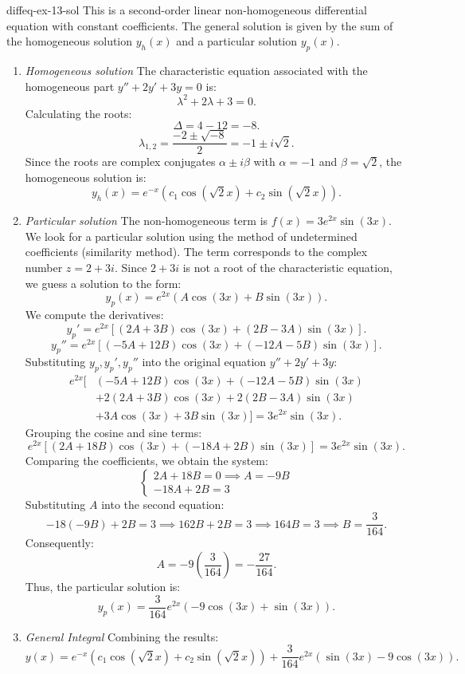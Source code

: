 \documentclass[preview]{standalone}
\begin{document}
\begin{snippetsolution}{diffeq-ex-13-sol}{}
    This is a second-order linear non-homogeneous differential equation with constant coefficients. The general solution is given by the sum of the homogeneous solution \(y_h(x)\) and a particular solution \(y_p(x)\).
    \begin{enumerate}
        \item \emph{Homogeneous solution}
        The characteristic equation associated with the homogeneous part \(y'' + 2y' + 3y = 0\) is:
        \[ \lambda^2 + 2\lambda + 3 = 0. \]
        Calculating the roots:
        \[ \Delta = 4 - 12 = -8. \]
        \[ \lambda_{1,2} = \frac{-2 \pm \sqrt{-8}}{2} = -1 \pm i\sqrt{2}. \]
        Since the roots are complex conjugates \(\alpha \pm i\beta\) with \(\alpha = -1\) and \(\beta = \sqrt{2}\), the homogeneous solution is:
        \[ y_h(x) = e^{-x}(c_1 \cos(\sqrt{2}x) + c_2 \sin(\sqrt{2}x)). \]
        \item \emph{Particular solution}
        The non-homogeneous term is \(f(x) = 3e^{2x} \sin(3x)\).
        We look for a particular solution using the method of undetermined coefficients (similarity method). The term corresponds to the complex number \(z = 2 + 3i\). Since \(2 + 3i\) is not a root of the characteristic equation, we guess a solution to the form:
        \[ y_p(x) = e^{2x}(A \cos(3x) + B \sin(3x)). \]
        We compute the derivatives:
        \[ y_p' = e^{2x}[ (2A+3B)\cos(3x) + (2B-3A)\sin(3x) ]. \]
        \[ y_p'' = e^{2x}[ (-5A+12B)\cos(3x) + (-12A-5B)\sin(3x) ]. \]
        Substituting \(y_p, y_p', y_p''\) into the original equation \(y'' + 2y' + 3y\):
        \begin{align*}
            e^{2x} [ &(-5A+12B)\cos(3x) + (-12A-5B)\sin(3x) \\
            &+ 2(2A+3B)\cos(3x) + 2(2B-3A)\sin(3x) \\
            &+ 3A\cos(3x) + 3B\sin(3x) ] = 3e^{2x} \sin(3x).
        \end{align*}
        Grouping the cosine and sine terms:
        \[ e^{2x} [ (2A + 18B)\cos(3x) + (-18A + 2B)\sin(3x) ] = 3e^{2x} \sin(3x). \]
        Comparing the coefficients, we obtain the system:
        \[
        \begin{cases}
            2A + 18B = 0 \implies A = -9B \\
            -18A + 2B = 3
        \end{cases}
        \]
        Substituting \(A\) into the second equation:
        \[ -18(-9B) + 2B = 3 \implies 162B + 2B = 3 \implies 164B = 3 \implies B = \frac{3}{164}. \]
        Consequently:
        \[ A = -9 \left(\frac{3}{164}\right) = -\frac{27}{164}. \]
        Thus, the particular solution is:
        \[ y_p(x) = \frac{3}{164} e^{2x} (-9 \cos(3x) + \sin(3x)). \]
        \item \emph{General Integral}
        Combining the results:
        \[ y(x) = e^{-x}(c_1 \cos(\sqrt{2}x) + c_2 \sin(\sqrt{2}x)) + \frac{3}{164} e^{2x} (\sin(3x) - 9 \cos(3x)). \]
    \end{enumerate}
\end{snippetsolution}
\end{document}
